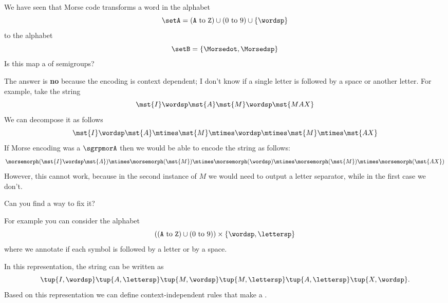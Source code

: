 \begin{exercise}
    We have seen that Morse code transforms a word in the alphabet
    \begin{equation*}
        \label{eq:morse-alphabet-ext}
        \setA = (\texttt{A} \ \text{to}\ \texttt{Z}) \cup (0 \ \text{to}\ 9) \cup \{\wordsp\}
    \end{equation*}
    to the alphabet
    \begin{equation*}
        \setB = \{\Morsedot, \Morsedsp\}
    \end{equation*}
    Is this map a \whomo of semigroups?
\end{exercise}
%
\begin{solution}
    The answer is \textbf{no} because the encoding is context dependent; I don't know if a single letter is followed by a space or another letter.
    For example, take the string
    \begin{equation}
        \label{eq:max-iammax}
        \mst {I} \wordsp \mst{A} \mst{M}\wordsp \mst{MAX}
    \end{equation}
    We can decompose it as follows
    \begin{equation}
        \label{eq:max-iammax-decomp}
        \mst{I}\wordsp \mst{A}\mtimes \mst{M} \mtimes \wordsp \mtimes \mst{M} \mtimes \mst{AX}
    \end{equation}
    If Morse encoding was a \whomo $\sgrpmorA$ then we would be able to encode the string as follows:
    \begin{equation}
        \label{eq:max-iammax-decomp-morph}
        \morsemorph(\mst{I}\wordsp \mst{A}) \mtimes \morsemorph (\mst{M}) \mtimes  \morsemorph(\wordsp) \mtimes  \morsemorph(\mst{M})
        \mtimes  \morsemorph(\mst{AX})
    \end{equation}
    However, this cannot work, because in the second instance of $M$ we would need to output a letter separator, while in the first case we don't.
    
    Can you find a way to fix it?
    
    For example you can consider the alphabet
    \begin{equation}
        \left( (\texttt{A} \ \text{to}\ \texttt{Z}) \cup (0 \ \text{to}\ 9) \right) \times \{\wordsp, \lettersp\}
    \end{equation}
    where we annotate if each symbol is followed by a letter or by a space.
    
    In this representation, the string can be written as
    \begin{equation}
        \tup{I, \wordsp} \tup{A, \lettersp} \tup{ M, \wordsp} \tup{M, \lettersp} \tup{A, \lettersp}
        \tup{X, \wordsp}.
    \end{equation}
    Based on this representation we can define context-independent rules that make a \whomo.
\end{solution}

